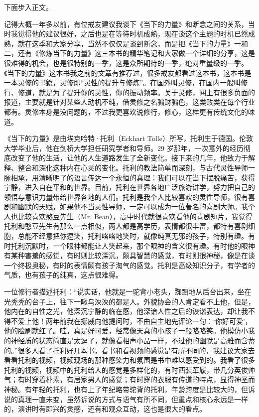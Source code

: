 下面步入正文。

记得大概一年多以前，有位戒友建议我谈下《当下的力量》和断念之间的关系，当时我觉得他的建议很好，之后也是在等待时机成熟，现在谈这个主题的时机已然成熟，就在这季和大家分享，当然不仅仅是谈到断念，而是把《当下的力量》一和二，还有《修炼当下的力量》这三本书的精华笔记和大家做一个详细的分享，这是很难得的机会，也是很特别的一季，这是众所期待的一季，绝对重量级的一季。《当下的力量》这本书我之前的文章有推荐过，很多戒友都看过这本书，这本书是一本灵修的书籍，灵修即“灵性的提升与修炼”。在国外叫灵修，在国内一般叫修行、修道，就是为了提升你的灵性，你的振动频率。关于灵修，网上有很多负面的报道，主要就是针对某些人动机不纯，借灵修之名骗财骗色，这类败类在每个行业都有。灵修本身是没问题的，不过我更喜欢说修行，修心，这样更有传统文化的味道。

《当下的力量》是由埃克哈特·托利（Eckhart Tolle）所写，托利生于德国。伦敦大学毕业后，他在剑桥大学担任研究学者和导师。29 岁那年，一次意外的经历彻底改变了他的生活，让他的人生道路发生了全新变化。接下来的几年，他致力于解释、整合和深化这种内在心灵的变化。托利的教法简单而深刻，与古代灵性导师一脉相承，用清晰明了的语言传达一个永恒的真理：我们可以在当下摆脱痛苦，获得宁静，进入自在平和的世界。目前，托利在世界各地广泛旅游讲学，努力把自己的领悟与意识力量带给世界各地的人们。托利是我个人比较喜欢的灵性导师，很有喜剧和幽默的天赋，如果他不当灵性导师，一定可以成为一位著名的喜剧大师。我个人也比较喜欢憨豆先生（Mr. Bean），高中时代就很喜欢看他的喜剧短片，我觉得托利和憨豆先生有那么一点相似，两人都是高学历，表情都很丰富，都特有喜剧细胞，总能不经意把你逗笑，托利咯咯地笑时，就像纯真无邪的孩子，特别有趣。有时托利沉默时，一个眼神都能让人笑起来，那个眼神的含义很有趣。有时他的眼神有某种害羞的感觉，有时则比较深沉，颇具智慧的感觉，有时则很神秘，像是在谈一个终极奥秘，有时的表情颇有孩子淘气的感觉。托利是高级知识分子，有学者的气质，也有孩子的纯真，这点很难得。

一位修行者描述托利：“说实话，他就是一驼背小老头，踟蹰地从后台出来，坐在光秃秃的台子上，往下一瞅乌泱泱的都是人。外貌协会的人肯定看不上他，但是，他内在的自性之光，他深沉宁静的临在感，他深谙人性之后的诙谐表达，却让我不得不爱上他！两年前我在挪威向他提问时，不由自主地先评论一句：‘你好可爱’，他的脸刷就红了。哇，真是好可爱，经常像天真的小孩子一般咯咯笑。他模仿小我的神经质的状态简直是太逗了，就像看相声小品一样，不过他的幽默是高雅而含蓄的。”很多人看了托利好几本书，看书和看视频的感觉是有所不同的，我建议大家去看看托利的视频，视频现场的那种感染力和氛围是书中难以感受到的。我看了很多托利的视频，视频中的托利给人的感觉是多样化的，有时西装革履，带几分英俊帅气；有时穿着朴素，有居家男人的感觉；有时穿的衣服有传道的特点，显得神圣而神秘。有年轻的托利，也有上了年纪略带驼背的托利，年龄跨度是比较大的，但诉说的真理一直未变，虽然诉说的方式与语气有所不同，但重点和核心永远是一样的，演讲时有即兴的灵感，还有和观众互动，这也是很大的看点。

